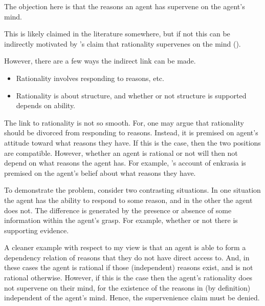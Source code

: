 \documentclass[10pt]{article}
\begin{document}
The objection here is that the reasons an agent has supervene on the agent's mind.

This is likely claimed in the literature somewhere, but if not this can be indirectly motivated by \citeauthor{Broome:2013aa}
's claim that rationality supervenes on the mind (\citeyear[151, etc.]{Broome:2013aa}).

However, there are a few ways the indirect link can be made.
\begin{itemize}
\item Rationality involves responding to reasons, etc.\
\item Rationality is about structure, and whether or not structure is supported depends on ability.
\end{itemize}

\begin{note}
  The link to rationality is not so smooth.
  For, one may argue that rationality should be divorced from responding to reasons.
  Instead, it is premised on agent's attitude toward what reasons they have.
  If this is the case, then the two positions are compatible.
  However, whether an agent is rational or not will then not depend on what reasons the agent has.
  For example, \citeauthor{Broome:2013aa}'s account of enkrasia is premised on the agent's belief about what reasons they have.
\end{note}

To demonstrate the problem, consider two contrasting situations.
In one situation the agent has the ability to respond to some reason, and in the other the agent does not.
The difference is generated by the presence or absence of some information within the agent's grasp.
For example, whether or not there is supporting evidence.

A cleaner example with respect to my view is that an agent is able to form a dependency relation of reasons that they do not have direct access to.
And, in these cases the agent is rational if those (independent) reasons exist, and is not rational otherwise.
However, if this is the case then the agent's rationality does not supervene on their mind, for the existence of the reasons in (by definition) independent of the agent's mind.
Hence, the supervenience claim must be denied.
\end{document}
